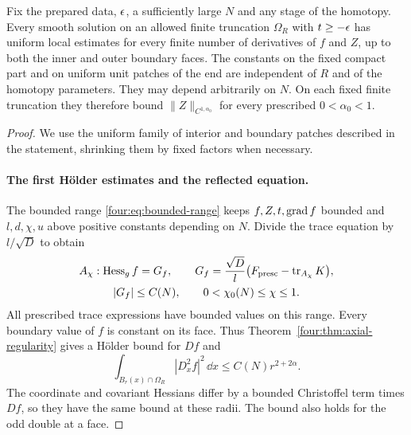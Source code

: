 \begin{proposition}\label{four:prop:coupled-regularity}
Fix the prepared data, $\epsilon$, a sufficiently large $N$ and any
stage of the homotopy.  Every smooth solution on an allowed finite
truncation $\Omega_R$ with $t\ge-\epsilon$ has uniform local estimates
for every finite number of derivatives of $f$ and $Z$, up to both
the inner and outer boundary faces.  The constants on the fixed
compact part and on uniform unit patches of the end are independent
of $R$ and of the homotopy parameters.  They may depend arbitrarily
on $N$.  On each fixed finite truncation they therefore bound
$\|Z\|_{C^{1,\alpha_0}}$ for every prescribed $0<\alpha_0<1$.
\end{proposition}

\begin{proof}
We use the uniform family of interior and boundary patches described
in the statement, shrinking them by fixed factors when necessary.

\paragraph{The first H\"older estimates and the reflected equation.}
The bounded range \eqref{four:eq:bounded-range} keeps
$f,Z,t,\operatorname{grad} f$ bounded and $l,d,\chi,u$ above positive constants
depending on $N$.  Divide the trace equation by $l/\sqrt D$ to obtain
\begin{equation}\label{four:reg:trace-normalized}
 \begin{gathered}
 A_\chi:\operatorname{Hess}_g f=G_f,\qquad
 G_f=\frac{\sqrt D}{l}
          \bigl(F_{\rm presc}-\operatorname{tr}_{A_\chi}K\bigr),\\
 |G_f|\le C(N),\qquad 0<\chi_0(N)\le\chi\le1.
 \end{gathered}
\end{equation}
All prescribed trace expressions have bounded values on this range.
Every boundary value of $f$ is constant on its face.  Thus
Theorem~\ref{four:thm:axial-regularity} gives a H\"older bound for $Df$
and
\begin{equation}\label{four:reg:f-morrey}
 \int_{B_r(x)\cap\Omega_R}|D_x^2f|^2\,\dd x
                         \le C(N)r^{2+2\alpha}.
\end{equation}
The coordinate and covariant Hessians differ by a bounded
Christoffel term times $Df$, so they have the same bound at these
radii.  The bound also holds for the odd double at a face.


\end{proof}
